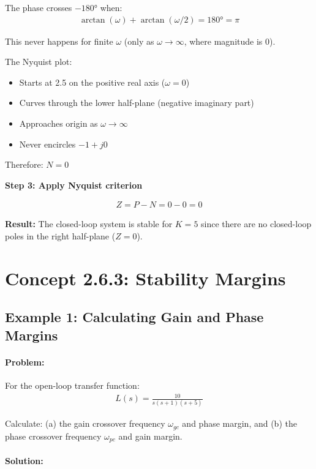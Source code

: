 \documentclass[11pt,a4paper]{article}
\begin{document}
The phase crosses $-180°$ when:
\begin{align}
\arctan(\omega) + \arctan(\omega/2) = 180° = \pi
\end{align}

This never happens for finite $\omega$ (only as $\omega \to \infty$, where magnitude is 0).

The Nyquist plot:
\begin{itemize}
\item Starts at 2.5 on the positive real axis ($\omega = 0$)
\item Curves through the lower half-plane (negative imaginary part)
\item Approaches origin as $\omega \to \infty$
\item Never encircles $-1 + j0$
\end{itemize}

Therefore: $N = 0$

\textbf{Step 3: Apply Nyquist criterion}

\begin{align}
Z = P - N = 0 - 0 = 0
\end{align}

\textbf{Result:} The closed-loop system is stable for $K = 5$ since there are no closed-loop poles in the right half-plane ($Z = 0$).

\section{Concept 2.6.3: Stability Margins}

\subsection{Example 1: Calculating Gain and Phase Margins}

\paragraph{Problem:} For the open-loop transfer function:
\begin{align}
L(s) = \frac{10}{s(s+1)(s+5)}
\end{align}

Calculate: (a) the gain crossover frequency $\omega_{gc}$ and phase margin, and (b) the phase crossover frequency $\omega_{pc}$ and gain margin.

\paragraph{Solution:}
\end{document}
